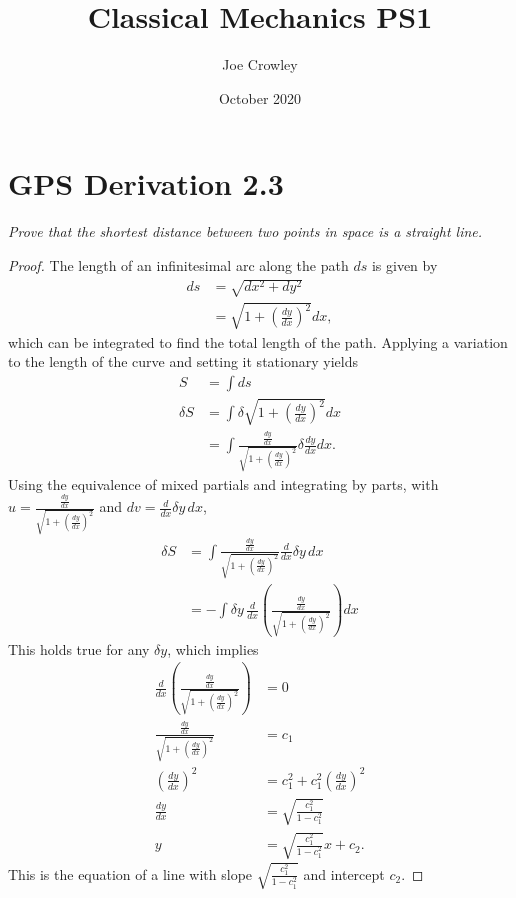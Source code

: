 \documentclass{article}
\title{Classical Mechanics PS1}
\author{Joe Crowley}
\date{October 2020}
\begin{document}
  

\section{GPS Derivation 2.3}
\textit{Prove that the shortest distance between two points in space is a straight line.}
\begin{proof}
    The length of an infinitesimal arc along the path $ds$ is given by 
    \begin{align*}
        ds &= \sqrt{dx^2 + dy^2} \\ 
        &= \sqrt{1+ \left( \frac{dy}{dx}\right)^2 }dx,
    \end{align*}
    which can be integrated to find the total length of the path. Applying a variation to the length of the curve and setting it stationary yields 
    \begin{align*}
        S &= \int{ds}\\
        \delta S &= \int{\delta \sqrt{1+ \left( \frac{dy}{dx}\right)^2 }dx}\\
        &= \int{\frac{\frac{dy}{dx}} {\sqrt{1+ \left( \frac{dy}{dx}\right)^2 }} \delta \frac{dy}{dx}dx}.
    \end{align*}
    Using the equivalence of mixed partials and integrating by parts, with $u = \frac{\frac{dy}{dx}} {\sqrt{1+ \left( \frac{dy}{dx}\right)^2 }}$ and $dv = \frac{d}{dx}\delta y \,dx$, 
    \begin{align*}
        \delta S&= \int{\frac{\frac{dy}{dx}} {\sqrt{1+ \left( \frac{dy}{dx}\right)^2 }} \frac{d}{dx}\delta y \,dx}\\
        &=-\int{\delta y \,\frac{d}{dx}\left( \frac{\frac{dy}{dx}} {\sqrt{1+ \left( \frac{dy}{dx}\right)^2 }}\right) dx}
    \end{align*}
    This holds true for any $\delta y$, which implies
    \begin{align*}
        \frac{d}{dx}\left( \frac{\frac{dy}{dx}} {\sqrt{1+ \left( \frac{dy}{dx}\right)^2 }}\right) & = 0\\
        \frac{\frac{dy}{dx}} {\sqrt{1+ \left( \frac{dy}{dx}\right)^2 }} &= c_1\\
        \left(\frac{d y}{d x}\right)^{2} &= c_{1}^{2}+c_{1}^{2}\left(\frac{d y}{d x}\right)^{2}\\
        \frac{d y}{d x}&=\sqrt{\frac{c_{1}^{2}}{1-c_{1}^{2}}}\\
        y&=\sqrt{\frac{c_{1}^{2}}{1-c_{1}^{2}}} x+c_{2}.
    \end{align*}
        This is the equation of a line with slope $\sqrt{\frac{c_{1}^{2}}{1-c_{1}^{2}}}$ and intercept $c_2$.
\end{proof}
\end{document}
